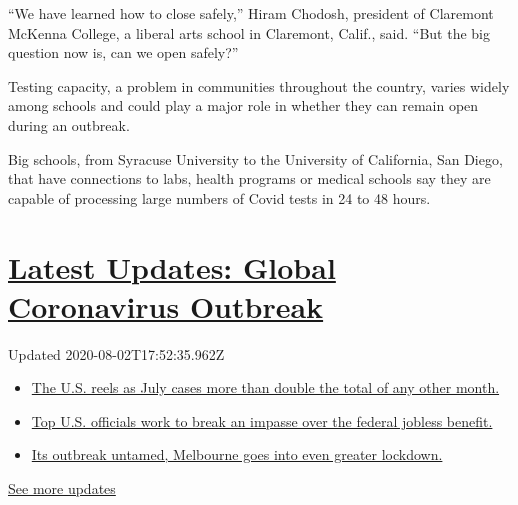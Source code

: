 ``We have learned how to close safely,'' Hiram Chodosh, president of
Claremont McKenna College, a liberal arts school in Claremont, Calif.,
said. ``But the big question now is, can we open safely?''

Testing capacity, a problem in communities throughout the country,
varies widely among schools and could play a major role in whether they
can remain open during an outbreak.

Big schools, from Syracuse University to the University of California,
San Diego, that have connections to labs, health programs or medical
schools say they are capable of processing large numbers of Covid tests
in 24 to 48 hours.

\hypertarget{latest-updates-global-coronavirus-outbreak}{%
\section{\texorpdfstring{\href{https://www.nytimes.com/2020/08/01/world/coronavirus-covid-19.html?action=click\&pgtype=Article\&state=default\&region=MAIN_CONTENT_1\&context=storylines_live_updates}{Latest
Updates: Global Coronavirus
Outbreak}}{Latest Updates: Global Coronavirus Outbreak}}\label{latest-updates-global-coronavirus-outbreak}}

Updated 2020-08-02T17:52:35.962Z

\begin{itemize}
\tightlist
\item
  \href{https://www.nytimes.com/2020/08/01/world/coronavirus-covid-19.html?action=click\&pgtype=Article\&state=default\&region=MAIN_CONTENT_1\&context=storylines_live_updates\#link-34047410}{The
  U.S. reels as July cases more than double the total of any other
  month.}
\item
  \href{https://www.nytimes.com/2020/08/01/world/coronavirus-covid-19.html?action=click\&pgtype=Article\&state=default\&region=MAIN_CONTENT_1\&context=storylines_live_updates\#link-780ec966}{Top
  U.S. officials work to break an impasse over the federal jobless
  benefit.}
\item
  \href{https://www.nytimes.com/2020/08/01/world/coronavirus-covid-19.html?action=click\&pgtype=Article\&state=default\&region=MAIN_CONTENT_1\&context=storylines_live_updates\#link-2bc8948}{Its
  outbreak untamed, Melbourne goes into even greater lockdown.}
\end{itemize}

\href{https://www.nytimes.com/2020/08/01/world/coronavirus-covid-19.html?action=click\&pgtype=Article\&state=default\&region=MAIN_CONTENT_1\&context=storylines_live_updates}{See
more updates}

